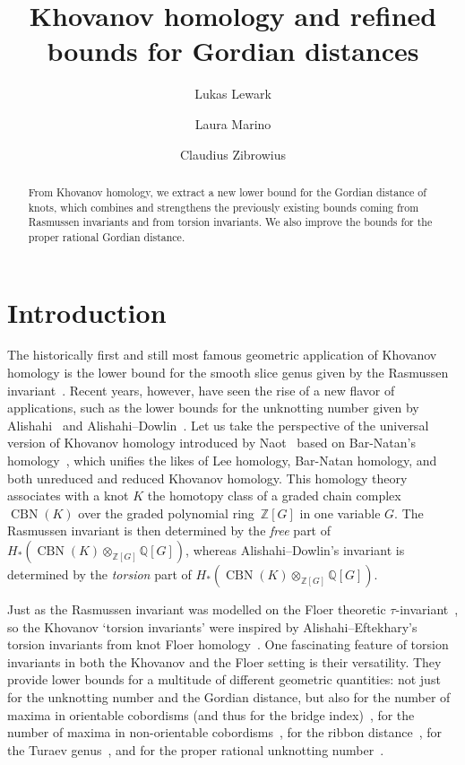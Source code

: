 \documentclass[11pt,a4paper,twoside]{amsart}
\title[Khovanov homology and refined bounds for Gordian distances]{Khovanov homology \break and refined bounds for Gordian distances}
\author{Lukas Lewark}
\author{Laura Marino}
\author{Claudius Zibrowius}
\theoremstyle{definition}
\newcommand{\BNr}{{\operatorname{CBN}}}%
\newcommand{\Z}{\mathbb{Z}}
\begin{document}
\begin{abstract}
From Khovanov homology, we extract a new lower bound for the Gordian distance of knots, which combines and strengthens the previously existing bounds coming from Rasmussen invariants and from torsion invariants. We also improve the bounds for the proper rational Gordian distance.
\end{abstract}

\maketitle

\section{Introduction}\label{sec:intro}

The historically first and still most famous geometric application of Khovanov homology is
the lower bound for the smooth slice genus
given by the Rasmussen invariant~\cite{RasmussenSlice}.
Recent years, however, have seen the rise of a new flavor of applications,
such as the lower bounds for the unknotting number given by Alishahi~\cite{zbMATH07178864} and Alishahi--Dowlin~\cite{zbMATH07005602}.
Let us take the perspective of the universal version of Khovanov homology introduced by Naot~\cite{naot} based on Bar-Natan's homology~\cite{BarNatanKhT},
which unifies the likes of Lee homology,
Bar-Natan homology, and both unreduced and reduced Khovanov homology.
This homology theory associates with a knot $K$ the homotopy class
of a graded chain complex $\BNr(K)$ over the graded polynomial ring~$\Z[G]$
in one variable $G$.
The Rasmussen invariant is then determined by the \emph{free} part of $H_*(\BNr(K) \otimes_{\Z[G]} \mathbb{Q}[G])$,
whereas Alishahi--Dowlin's invariant is determined by the \emph{torsion} part of $H_*(\BNr(K) \otimes_{\Z[G]} \mathbb{Q}[G])$.
%
%
%

Just as the Rasmussen invariant was modelled on the Floer theoretic $\tau$-invariant~\cite{osz10,phdrasmussen},
so the Khovanov `torsion invariants' were inspired by Alishahi--Eftekhary's torsion invariants from knot Floer homology~\cite{zbMATH07262229,zbMATH07305772}.
One fascinating feature of torsion invariants in both the Khovanov and the Floer setting
is their versatility. They provide lower bounds for a multitude of different geometric quantities:
not just for the unknotting number and the Gordian distance,
but also for the number of maxima in orientable cobordisms (and thus for the bridge index)~\cite{zbMATH07311838,zbMATH07527797},
for the number of maxima in non-orientable cobordisms~\cite{zbMATH07786943},
for the ribbon distance~\cite{zbMATH07195384,gujral},
for the Turaev genus~\cite{zbMATH07608601},
and for the proper rational unknotting number~\cite{lambda1,2203.09319}.
\end{document}
